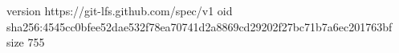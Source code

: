 version https://git-lfs.github.com/spec/v1
oid sha256:4545cc0bfee52dae532f78ea70741d2a8869cd29202f27bc71b7a6ec201763bf
size 755
